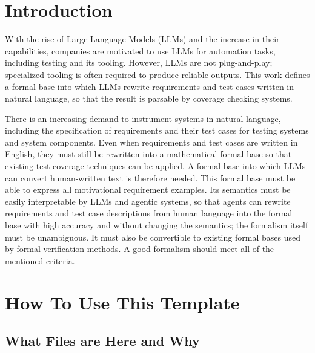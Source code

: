\section{Introduction}

With the rise of Large Language Models (LLMs) and the increase
in their capabilities, companies are motivated to use LLMs for
automation tasks, including testing and its tooling. However, LLMs
are not plug-and-play; specialized tooling is often required to
produce reliable outputs.
This work defines a formal base into which LLMs rewrite requirements
and test cases written in natural language, so that the result is
parsable by coverage checking systems.

There is an increasing demand to instrument systems in natural
language, including the specification of requirements and their
test cases for testing systems and system components. Even when
requirements and test cases are written in English, they must
still be rewritten into a mathematical formal base so that existing
test-coverage techniques can be applied. A formal
base into which LLMs can convert human-written text is therefore
needed. This formal base must be able to express all motivational
requirement examples. Its semantics must be easily interpretable
by LLMs and agentic systems, so that agents can rewrite requirements
and test case descriptions from human language into the formal base
with high accuracy and without changing the semantics; the formalism
itself must be unambiguous. It must also be convertible to existing
formal bases used by formal verification methods. A good formalism
should meet all of the mentioned criteria.

\section{How To Use This Template}

\subsection{What Files are Here and Why}

